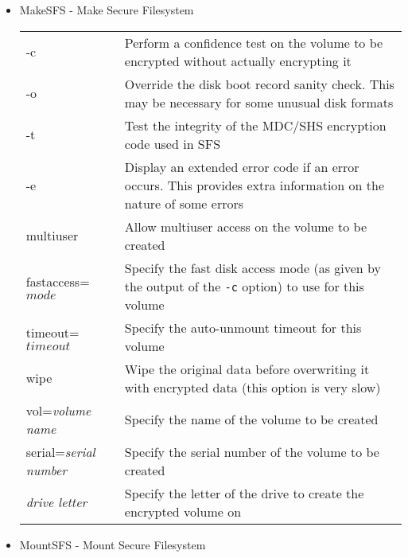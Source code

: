 \begin{itemize}

\item MakeSFS - Make Secure Filesystem

  \begin{tabular}{l p{222.4pt} }

  -c                         & Perform a confidence test on the volume to be
                               encrypted without actually encrypting it\\

  -o                         & Override the disk boot record sanity check. This may be
                               necessary for some unusual disk formats\\

  -t                         & Test the integrity of the MDC/SHS encryption code
                               used in SFS\\

  -e                         & Display an extended error code if an error occurs.  This provides
                               extra information on the nature of some errors\\

  multiuser                  & Allow multiuser access on the volume to be created\\

  fastaccess=$mode$   & Specify the fast disk access mode (as given by the
                        output of the {\tt -c} option) to use for this volume\\
  timeout=$timeout$   & Specify the auto-unmount timeout for this volume\\
  wipe                & Wipe the original data before overwriting it with
                        encrypted data (this option is very slow)\\

  vol={\em volume name}      & Specify the name of the volume to be created\\

  serial={\em serial number} & Specify the serial number of the volume to be created\\

  {\em drive letter}         & Specify the letter of the drive to create the
                               encrypted volume on\\
  \end{tabular}

\item MountSFS - Mount Secure Filesystem
\nopagebreak


\end{itemize}
